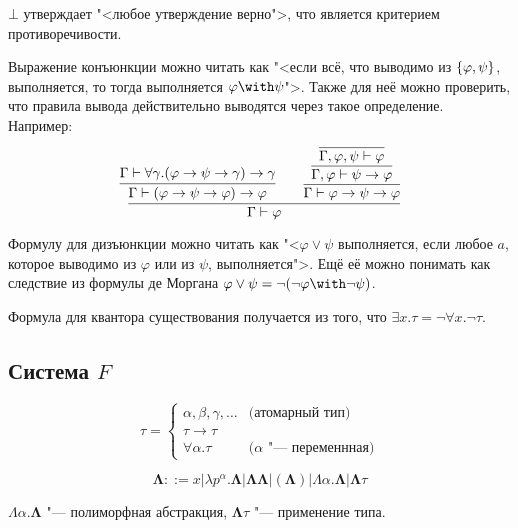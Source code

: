 $\bot$ утверждает "<любое утверждение верно">, что является критерием противоречивости.

Выражение конъюнкции можно читать как "<если всё, что выводимо из $\left\{\varphi,\psi\right\}$, выполняется,
то тогда выполняется $\varphi\with\psi$">.
Также для неё можно проверить, что правила вывода действительно выводятся через такое определение. Например:
\[
    \infer{\Gamma \vdash \varphi}
    {
        \infer{\Gamma \vdash (\varphi\rightarrow\psi\rightarrow\varphi)\rightarrow\varphi}
            {\Gamma \vdash \forall \gamma.(\varphi\rightarrow\psi\rightarrow\gamma)\rightarrow\gamma}
        &&
        \infer{\Gamma\vdash\varphi\rightarrow\psi\rightarrow\varphi}
        {\infer{\Gamma,\varphi\vdash\psi\rightarrow\varphi}
        {\infer{\Gamma,\varphi,\psi\vdash\varphi}
        {}}}
    }
\]

Формулу для дизъюнкции можно читать как "<$\varphi \vee \psi$ выполняется,
если любое $a$, которое выводимо из $\varphi$ или из $\psi$, выполняется">.
Ещё её можно понимать как следствие из формулы де Моргана $\varphi\vee\psi=\neg(\neg\varphi\with\neg\psi)$.

Формула для квантора существования получается из того, что $\exists x . \tau = \neg \forall x . \neg \tau$.

\subsection{\texorpdfstring{Система $F$}{System F}}
\begin{definition}
\[
    \tau =
    \begin{cases}
        \alpha, \beta, \gamma, \ldots & \text{(атомарный тип)} \\
        \tau \rightarrow \tau \\
        \forall \alpha . \tau & \text{($\alpha$ "--- переменнная)}
    \end{cases}
\]
\end{definition}

\begin{definition}
    \begin{bnf}
    \[
        \mathbf\Lambda ::= x | \lambda p^\alpha . \mathbf\Lambda | \mathbf\Lambda \mathbf\Lambda | (\mathbf\Lambda)
        | \Lambda \alpha . \mathbf\Lambda | \mathbf\Lambda \tau
    \]
    \end{bnf}%
    $\Lambda \alpha . \mathbf\Lambda$ "--- полиморфная абстракция, $\mathbf\Lambda \tau$ "--- применение типа.
\end{definition}

